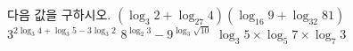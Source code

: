 다음 값을 구하시오.
 $(\log_3 2+\log_{27} 4)(\log_{16} 9+\log_{32} 81)$
 $3^{2\log_3 4+\log_3 5-3\log_3 2}$
 $8^{\log_2 3}-9^{\log_3 \sqrt{10}}$
 $\log_3 5\times\log_5 7\times\log_7 3$
